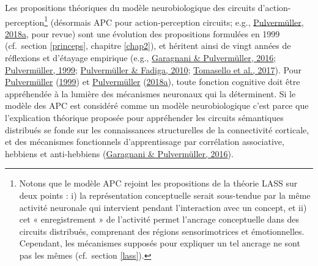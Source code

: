 \documentclass[
  a4paper,12pt,twoside,onecolumn,openright,final,oldfontcommands]{memoir}
\begin{document}
Les propositions théoriques du modèle neurobiologique des circuits d'action-perception\footnote{Notons que le modèle APC rejoint les propositions de la théorie LASS sur deux points : i) la représentation conceptuelle serait sous-tendue par la même activité neuronale qui intervient pendant l'interaction avec un concept, et ii) cet « enregistrement » de l'activité permet l'ancrage conceptuelle dans des circuits distribués, comprenant des régions sensorimotrices et émotionnelles. Cependant, les mécanismes supposés pour expliquer un tel ancrage ne sont pas les mêmes (cf.~section \ref{lass}).} (désormais APC pour action-perception circuits; e.g., \protect\hyperlink{ref-pulvermuller_neural_2018}{Pulvermüller, 2018a}, pour revue) sont une évolution des propositions formulées en 1999 (cf.~section \ref{princeps}, chapitre \ref{chap2}), et héritent ainsi de vingt années de réflexions et d'étayage empirique (e.g., \protect\hyperlink{ref-garagnani_conceptual_2016}{Garagnani \& Pulvermüller, 2016}; \protect\hyperlink{ref-pulvermuller_words_1999}{Pulvermüller, 1999}; \protect\hyperlink{ref-pulvermuller_active_2010}{Pulvermüller \& Fadiga, 2010}; \protect\hyperlink{ref-tomasello_brain_2017}{Tomasello et al., 2017}). Pour \protect\hyperlink{ref-pulvermuller_words_1999}{Pulvermüller} (\protect\hyperlink{ref-pulvermuller_words_1999}{1999}) et \protect\hyperlink{ref-pulvermuller_neural_2018}{Pulvermüller} (\protect\hyperlink{ref-pulvermuller_neural_2018}{2018a}), toute fonction cognitive doit être appréhendée à la lumière des mécanismes neuronaux qui la déterminent. Si le modèle des APC est considéré comme un modèle neurobiologique c'est parce que l'explication théorique proposée pour appréhender les circuits sémantiques distribués se fonde sur les connaissances structurelles de la connectivité corticale, et des mécanismes fonctionnels d'apprentissage par corrélation associative, hebbiens et anti-hebbiens (\protect\hyperlink{ref-garagnani_conceptual_2016}{Garagnani \& Pulvermüller, 2016}).
\end{document}
